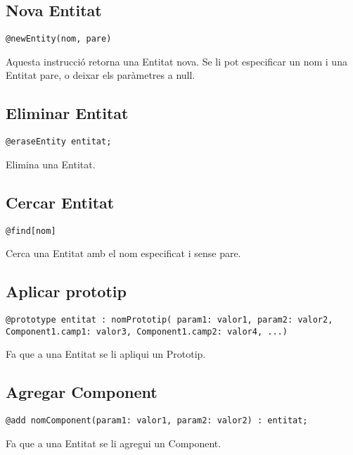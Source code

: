 \subsection{Nova Entitat}

\begin{verbatim}
@newEntity(nom, pare)
\end{verbatim}

Aquesta instrucció retorna una Entitat nova. Se li pot especificar un nom i una Entitat pare, o deixar els paràmetres a null.

\subsection{Eliminar Entitat}

\begin{verbatim}
@eraseEntity entitat;
\end{verbatim}

Elimina una Entitat.

\subsection{Cercar Entitat}

\begin{verbatim}
@find[nom]
\end{verbatim}

Cerca una Entitat amb el nom especificat i sense pare.

\subsection{Aplicar prototip}

\begin{verbatim}
@prototype entitat : nomPrototip( param1: valor1, param2: valor2, Component1.camp1: valor3, Component1.camp2: valor4, ...)
\end{verbatim}

Fa que a una Entitat se li apliqui un Prototip.

\subsection{Agregar Component}

\begin{verbatim}
@add nomComponent(param1: valor1, param2: valor2) : entitat;
\end{verbatim}

Fa que a una Entitat se li agregui un Component.

